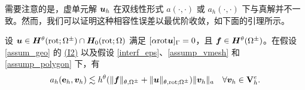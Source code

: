 需要注意的是，虚单元解 $\boldsymbol{u}_h$ 在双线性形式 $a(\cdot,\cdot)$ 或
$a_h(\cdot,\cdot)$
下与真解并不一致。然而，我们可以证明这种相容性误差以最优阶收敛，如下面的引理所示。

\begin{lemma}
\label{lem_consist}
设 $\boldsymbol{u}\in \boldsymbol{H}^{\theta}(\mathrm{rot};\Omega^{\pm})\cap \boldsymbol{H}_0(\mathrm{rot};\Omega)$ 满足 $[\alpha \mathrm{rot} \boldsymbol{u}]_{\Gamma} = 0$，且 $\boldsymbol{f}\in \boldsymbol{H}^{\theta}(\Omega^{\pm}) $。在假设 \ref{assum_geo} 的 \hyperref[asp:I2]{(I2)} 以及假设 \ref{interf_eps}、\ref{assump_vmesh} 和 \ref{assump_polygon} 下，有
\begin{equation}
\label{lem_consist_eq0}
a_h(\mathbf{e}_h,\boldsymbol{v}_h) \lesssim h^{\theta}( \| \boldsymbol{f} \|_{\theta,\Omega^{\pm}} + \| \boldsymbol{u} \|_{\theta,\mathrm{rot};\Omega^{\pm}} ) \| \boldsymbol{v}_h \|_{a} ~~~ \forall \boldsymbol{v}_h \in \mathbf{V}^e_h.
\end{equation}
\end{lemma}
